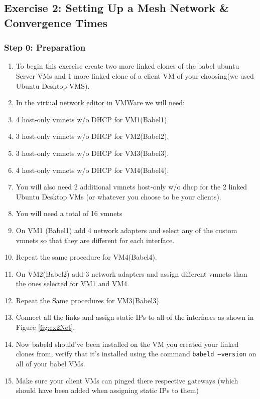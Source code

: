 \documentclass[main.tex]{subfiles}
\begin{document}
\subsection{Exercise 2: Setting Up a Mesh Network \& Convergence Times  }
\begin{itemize}


\subsubsection{Step 0: Preparation}
\begin{enumerate}[noitemsep,label=$\bullet$,leftmargin=20mm,labelsep=0.5cm]
\item To begin this exercise create two more linked clones of the babel ubuntu Server VMs and 1 more linked clone of a client VM of your choosing(we used Ubuntu Desktop VMS).
\item In the virtual network editor in VMWare we will need:
\item 4 host-only vmnets w/o DHCP for VM1(Babel1).
\item 3 host-only vmnets w/o DHCP for VM2(Babel2).
\item 3 host-only vmnets w/o DHCP for VM3(Babel3).
\item 4 host-only vmnets w/o DHCP for VM4(Babel4).
\item You will also need 2 additional vmnets host-only w/o dhcp for the 2 linked Ubuntu Desktop VMs (or whatever you choose to be your clients).
\item You will need a total of 16 vmnets
\item On VM1 (Babel1) add 4 network adapters and select any of the custom vmnets so that they are different for each interface.
\item Repeat the same procedure for VM4(Babel4).
\item On VM2(Babel2) add 3 network adapters and assign different vmnets than the ones selected for VM1 and VM4.
\item Repeat the Same procedures for VM3(Babel3).
\item Connect all the links and assign static IPs to all of the interfaces as shown in Figure \ref{fig:ex2Net}.
\item Now babeld should've been installed on the VM you created your linked clones from, verify that it's installed using the command \texttt{babeld --version} on all of your babel VMs.
\item Make sure your client VMs can pinged there respective gateways (which should have been added when assigning static IPs to them)
\end{enumerate}


\end{itemize}
\end{document}

